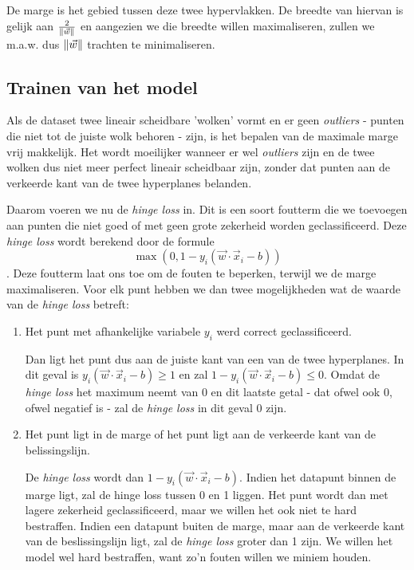 \documentclass[TeamE-eindrapport]{subfiles}
\begin{document}
	De marge is het gebied tussen deze twee hypervlakken. De breedte van hiervan is gelijk aan \(\frac{2}{\left\| \vec{w} \right\|}\) en aangezien we die breedte willen maximaliseren, zullen we m.a.w. dus \(\left\| \vec{w} \right\|\) trachten te minimaliseren.
	
	\subsection{Trainen van het model}
	
	Als de dataset twee lineair scheidbare 'wolken' vormt en er geen \textit{outliers} - punten die niet tot de juiste wolk behoren - zijn, is het bepalen van de maximale marge vrij makkelijk. Het wordt moeilijker wanneer er wel \textit{outliers} zijn en de twee wolken dus niet meer perfect lineair scheidbaar zijn, zonder dat punten aan de verkeerde kant van de twee hyperplanes belanden.
	
	Daarom voeren we nu de \textit{hinge loss} in. Dit is een soort foutterm die we toevoegen aan punten die niet goed of met geen grote zekerheid worden geclassificeerd. Deze \textit{hinge loss} wordt berekend door de formule \[\max{(0,1-y_i(\vec{w}\cdot\vec{x}_i-b))}\]. Deze foutterm laat ons toe om de fouten te beperken, terwijl we de marge maximaliseren. Voor elk punt hebben we dan twee mogelijkheden wat de waarde van de \textit{hinge loss} betreft:
	
	\begin{enumerate}
		\item Het punt met afhankelijke variabele \(y_i\) werd correct geclassificeerd.
		
		Dan ligt het punt dus aan de juiste kant van een van de twee hyperplanes. In dit geval is \(y_i(\vec{w}\cdot\vec{x}_i-b)\ge1\) en zal \(1 - y_i(\vec{w}\cdot\vec{x}_i-b)\le0\). Omdat de \textit{hinge loss} het maximum neemt van 0 en dit laatste getal - dat ofwel ook 0, ofwel negatief is - zal de \textit{hinge loss} in dit geval 0 zijn.
		
		\item Het punt ligt in de marge of het punt ligt aan de verkeerde kant van de belissingslijn. 
		
		De \textit{hinge loss} wordt dan \(1 - y_i(\vec{w}\cdot\vec{x}_i - b)\). Indien het datapunt binnen de marge ligt, zal de hinge loss tussen 0 en 1 liggen. Het punt wordt dan met lagere zekerheid geclassificeerd, maar we willen het ook niet te hard bestraffen. Indien een datapunt buiten de marge, maar aan de verkeerde kant van de beslissingslijn ligt, zal de \textit{hinge loss} groter dan 1 zijn. We willen het model wel hard bestraffen, want zo'n fouten willen we miniem houden.
	\end{enumerate}
	
\end{document}
